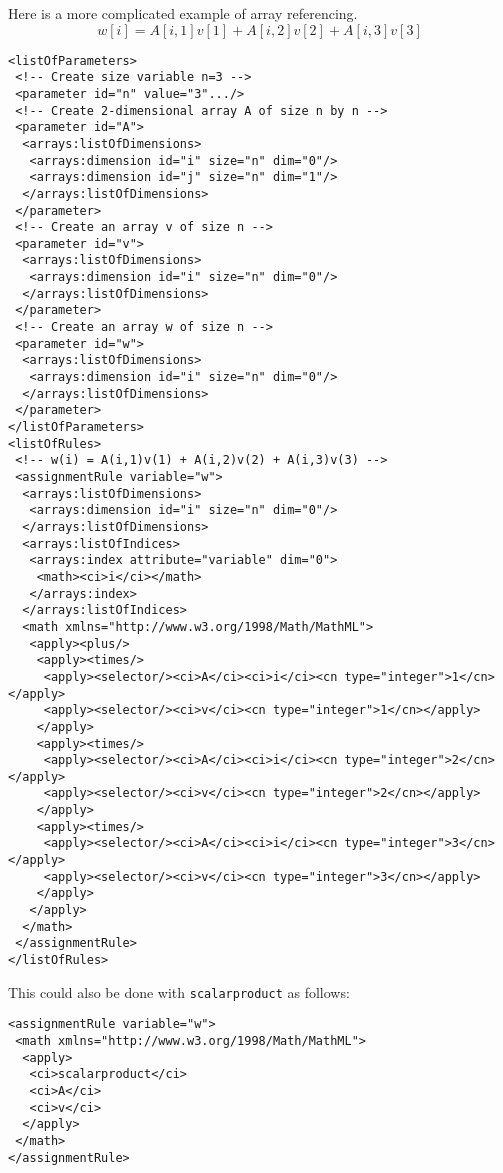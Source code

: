 
Here is a more complicated example of array referencing.
\begin{displaymath}
w[i]= A[i,1]v[1]+ A[i,2]v[2]+ A[i,3]v[3]
\end{displaymath}

\begin{verbatim}
<listOfParameters> 
 <!-- Create size variable n=3 -->
 <parameter id="n" value="3".../>
 <!-- Create 2-dimensional array A of size n by n -->
 <parameter id="A">
  <arrays:listOfDimensions>
   <arrays:dimension id="i" size="n" dim="0"/> 
   <arrays:dimension id="j" size="n" dim="1"/>
  </arrays:listOfDimensions> 
 </parameter> 
 <!-- Create an array v of size n -->
 <parameter id="v">
  <arrays:listOfDimensions>
   <arrays:dimension id="i" size="n" dim="0"/>
  </arrays:listOfDimensions> 
 </parameter> 
 <!-- Create an array w of size n -->
 <parameter id="w">
  <arrays:listOfDimensions>
   <arrays:dimension id="i" size="n" dim="0"/>
  </arrays:listOfDimensions> 
 </parameter>
</listOfParameters>
<listOfRules>
 <!-- w(i) = A(i,1)v(1) + A(i,2)v(2) + A(i,3)v(3) -->
 <assignmentRule variable="w">
  <arrays:listOfDimensions>
   <arrays:dimension id="i" size="n" dim="0"/>
  </arrays:listOfDimensions> 
  <arrays:listOfIndices>
   <arrays:index attribute="variable" dim="0">
    <math><ci>i</ci></math>
   </arrays:index>
  </arrays:listOfIndices>
  <math xmlns="http://www.w3.org/1998/Math/MathML">
   <apply><plus/>
    <apply><times/>
     <apply><selector/><ci>A</ci><ci>i</ci><cn type="integer">1</cn></apply>
     <apply><selector/><ci>v</ci><cn type="integer">1</cn></apply>
    </apply>
    <apply><times/>
     <apply><selector/><ci>A</ci><ci>i</ci><cn type="integer">2</cn></apply>
     <apply><selector/><ci>v</ci><cn type="integer">2</cn></apply>
    </apply>
    <apply><times/>
     <apply><selector/><ci>A</ci><ci>i</ci><cn type="integer">3</cn></apply>
     <apply><selector/><ci>v</ci><cn type="integer">3</cn></apply>
    </apply>
   </apply>
  </math>
 </assignmentRule>
</listOfRules>
\end{verbatim}

This could also be done with {\tt scalarproduct} as follows:

\begin{verbatim}
<assignmentRule variable="w">
 <math xmlns="http://www.w3.org/1998/Math/MathML">
  <apply>
   <ci>scalarproduct</ci>
   <ci>A</ci>
   <ci>v</ci>
  </apply>
 </math>
</assignmentRule>
\end{verbatim}

